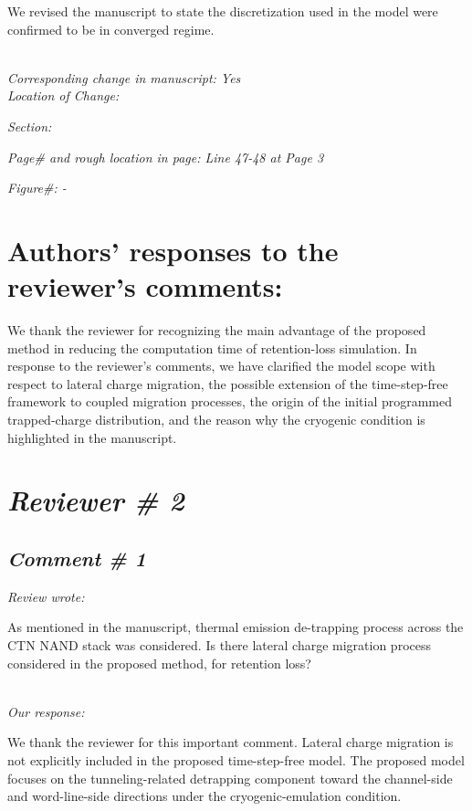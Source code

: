 \documentclass[11pt]{article}
\begin{document}
We revised the manuscript to state the discretization used in the model were confirmed to be in converged regime.

\noindent \textit{\\Corresponding change in manuscript: Yes \\Location of Change:}

\hspace{40pt} \noindent \textit{Section: \uppercase\expandafter{}}

\hspace{40pt} \noindent \textit{Page\# and rough location in page: Line 47-48 at Page 3}

\hspace{40pt} \noindent \textit{Figure\#: - }

\newpage

\section*{\normalsize{Authors' responses to the reviewer's comments:}}

We thank the reviewer for recognizing the main advantage of the proposed method in reducing the computation time of retention-loss simulation.
In response to the reviewer’s comments, we have clarified the model scope with respect to lateral charge migration, the possible extension of the time-step-free framework to coupled migration processes, the origin of the initial programmed trapped-charge distribution, and the reason why the cryogenic condition is highlighted in the manuscript.

\section*{\textit{Reviewer \# 2}}
\subsection*{\textit{Comment \# 1}}

\noindent \textit{Review wrote: }

As mentioned in the manuscript, thermal emission de-trapping process across the CTN NAND stack was considered.
Is there lateral charge migration process considered in the proposed method, for retention loss?

\noindent \textit{\\Our response: }

We thank the reviewer for this important comment.
Lateral charge migration is not explicitly included in the proposed time-step-free model.
The proposed model focuses on the tunneling-related detrapping component toward the channel-side and word-line-side directions under the cryogenic-emulation condition.
\end{document}
